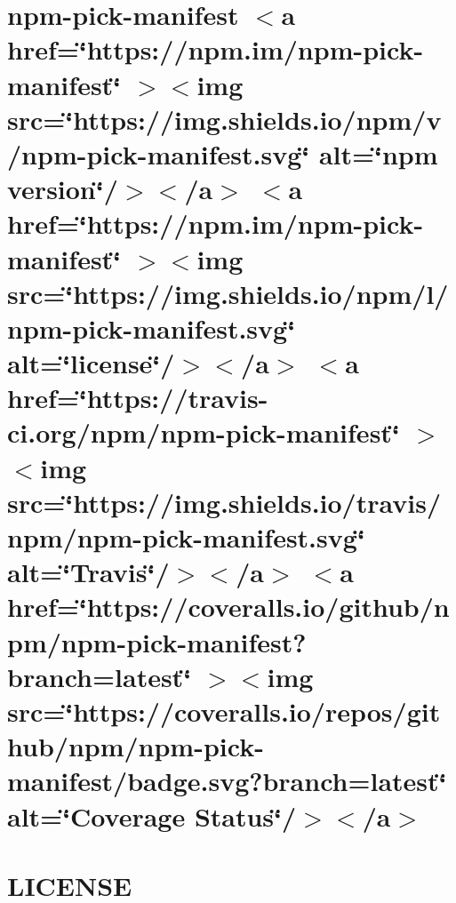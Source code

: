 \documentclass[twoside]{book}
\newcommand{\+}{\discretionary{\mbox{\scriptsize$\hookleftarrow$}}{}{}}
\begin{document}
\chapter{npm-\/pick-\/manifest \texorpdfstring{$<$}{<}a href=\char`\"{}https\+://npm.\+im/npm-\/pick-\/manifest\char`\"{} \texorpdfstring{$>$}{>}\texorpdfstring{$<$}{<}img src=\char`\"{}https\+://img.\+shields.\+io/npm/v/npm-\/pick-\/manifest.\+svg\char`\"{} alt=\char`\"{}npm version\char`\"{}/\texorpdfstring{$>$}{>}\texorpdfstring{$<$}{<}/a\texorpdfstring{$>$}{>} \texorpdfstring{$<$}{<}a href=\char`\"{}https\+://npm.\+im/npm-\/pick-\/manifest\char`\"{} \texorpdfstring{$>$}{>}\texorpdfstring{$<$}{<}img src=\char`\"{}https\+://img.\+shields.\+io/npm/l/npm-\/pick-\/manifest.\+svg\char`\"{} alt=\char`\"{}license\char`\"{}/\texorpdfstring{$>$}{>}\texorpdfstring{$<$}{<}/a\texorpdfstring{$>$}{>} \texorpdfstring{$<$}{<}a href=\char`\"{}https\+://travis-\/ci.\+org/npm/npm-\/pick-\/manifest\char`\"{} \texorpdfstring{$>$}{>}\texorpdfstring{$<$}{<}img src=\char`\"{}https\+://img.\+shields.\+io/travis/npm/npm-\/pick-\/manifest.\+svg\char`\"{} alt=\char`\"{}\+Travis\char`\"{}/\texorpdfstring{$>$}{>}\texorpdfstring{$<$}{<}/a\texorpdfstring{$>$}{>} \texorpdfstring{$<$}{<}a href=\char`\"{}https\+://coveralls.\+io/github/npm/npm-\/pick-\/manifest?branch=latest\char`\"{} \texorpdfstring{$>$}{>}\texorpdfstring{$<$}{<}img src=\char`\"{}https\+://coveralls.\+io/repos/github/npm/npm-\/pick-\/manifest/badge.\+svg?branch=latest\char`\"{} alt=\char`\"{}\+Coverage Status\char`\"{}/\texorpdfstring{$>$}{>}\texorpdfstring{$<$}{<}/a\texorpdfstring{$>$}{>}}
\label{md__c___users_vaishnavi_jadhav__desktop__developer_code_mean_stack_example_client_node_modules_npm_pick_manifest__r_e_a_d_m_e}

\chapter{LICENSE}
\label{md__c___users_vaishnavi_jadhav__desktop__developer_code_mean_stack_example_client_node_modules_n198a33e61d176503c4fbd3ff9f954768}

\end{document}
